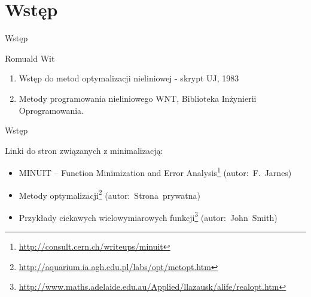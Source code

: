 \section{Wstęp}

  \begin{frame}{Wstęp}
    \begin{block}{Romuald Wit}
      \begin{enumerate}
        \item Wstęp do metod optymalizacji nieliniowej - skrypt
        UJ, 1983
        \item Metody programowania nieliniowego WNT, Biblioteka
        Inżynierii Oprogramowania.
      \end{enumerate}
    \end{block}
  \end{frame}

  \begin{frame}{Wstęp}
    \begin{block}{Linki do stron związanych z minimalizacją:}
      \begin{itemize}
        \item MINUIT -- Function Minimization and Error
        Analysis\footnote{\url{http://consult.cern.ch/writeups/minuit}}
        (autor:~F.~Jarnes)
        \item Metody optymalizacji\footnote{\url{http://aquarium.ia.agh.edu.pl/labs/opt/metopt.htm}}
        (autor:~Strona~prywatna)
        \item Przykłady ciekawych wielowymiarowych
        funkcji\footnote{\url{http://www.maths.adelaide.edu.au/Applied/llazausk/alife/realopt.htm}}
        (autor:~John~Smith)
      \end{itemize}
    \end{block}
  \end{frame}


